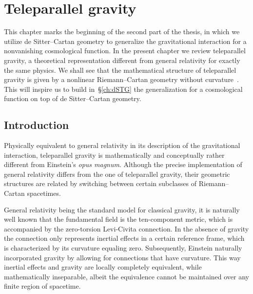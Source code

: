 \documentclass[
final,
11pt,
a4paper,
DIV=11,
headinclude=true,
footinclude=false,
bibliography=totoc,
twoside=true,  %
BCOR=5mm
]{scrbook}
\begin{document}
\begin{comment}
\setchapterpreamble[u]{%
  \dictum[Richard Feynman, The Character of Physical Law]{%
    Therefore psychologically we must keep all the theories in 
    our heads, and every theoretical physicist who is any good 
    knows six or seven different theoretical representations for 
    exactly the same physics. He knows that they are all 
    equivalent, and that nobody is ever going to be able to 
    decide which one is right at that level, but he keeps them in 
    in his head, hoping that they will give him different ideas 
    for guessing.

    That reminds me of another point, that the philosophy or 
    ideas around a theory may change enormously when there are 
    very tiny changes in the theory.
  }
  \dictumendskip%
}
\end{comment}
\chapter{Teleparallel gravity}
\label{ch:review_TG}

This chapter marks the beginning of the second part of the 
thesis, in which we utilize de Sitter--Cartan geometry to 
generalize the gravitational interaction for a nonvanishing 
cosmological function. In the present chapter we review 
teleparallel gravity, a theoretical representation different from 
general relativity for exactly the same physics. We shall see 
that the mathematical structure of teleparallel gravity is given 
by a nonlinear Riemann--Cartan geometry without 
curvature~\cite{Jennen:2015bxa}. This will inspire us to build 
in~\S\ref{ch:dSTG} the generalization for a cosmological function 
on top of de Sitter--Cartan geometry.

\section{Introduction}

Physically equivalent to general relativity in its description of 
the gravitational interaction, teleparallel gravity is 
mathematically and conceptually rather different from Einstein's 
\emph{opus magnum}. Although the precise implementation of 
general relativity differs from the one of teleparallel gravity, 
their geometric structures are related by switching between 
certain subclasses of Riemann--Cartan spacetimes.

General relativity being the standard model for classical 
gravity, it is naturally well known that the fundamental field is 
the ten-component metric, which is accompanied by the 
zero-torsion Levi-Civita connection. In the absence of gravity 
the connection only represents inertial effects in a certain 
reference frame, which is characterized by its curvature equaling 
zero. Subsequently, Einstein naturally incorporated gravity by 
allowing for connections that have curvature. This way inertial 
effects and gravity are locally completely equivalent, while 
mathematically inseparable, albeit the equivalence cannot be 
maintained over any finite region of spacetime.
\end{document}

